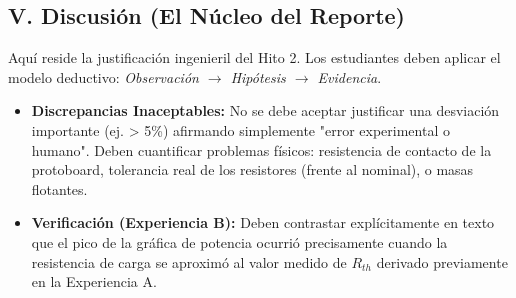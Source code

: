 \documentclass[journal, a4paper]{IEEEtran}
\begin{document}
\subsection{V. Discusión (El Núcleo del Reporte)}
Aquí reside la justificación ingenieril del Hito 2. Los estudiantes deben aplicar el modelo deductivo: \textit{Observación $\rightarrow$ Hipótesis $\rightarrow$ Evidencia}.
\begin{itemize}
    \item \textbf{Discrepancias Inaceptables:} No se debe aceptar justificar una desviación importante (ej. > 5\%) afirmando simplemente "error experimental o humano". Deben cuantificar problemas físicos: resistencia de contacto de la protoboard, tolerancia real de los resistores (frente al nominal), o masas flotantes.
    \item \textbf{Verificación (Experiencia B):} Deben contrastar explícitamente en texto que el pico de la gráfica de potencia ocurrió precisamente cuando la resistencia de carga se aproximó al valor medido de $R_{th}$ derivado previamente en la Experiencia A.
\end{itemize}
\end{document}
